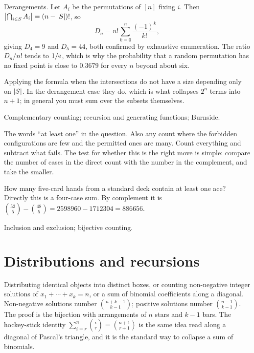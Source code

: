 \begin{worked}
Derangements. Let $A_{i}$ be the permutations of $[n]$ fixing $i$. Then $\left\lvert \bigcap_{i\in S}A_{i}\right\rvert=(n-\left\lvert S\right\rvert)!$, so
\[
D_{n}=n!\sum_{k=0}^{n}\frac{(-1)^{k}}{k!},
\]
giving $D_{4}=9$ and $D_{5}=44$, both confirmed by exhaustive enumeration. The ratio $D_{n}/n!$ tends to $1/\mathrm{e}$, which is why the probability that a random permutation has no fixed point is close to $0.3679$ for every $n$ beyond about six.
\end{worked}

\begin{trap}
Applying the formula when the intersections do not have a size depending only on $\left\lvert S\right\rvert$. In the derangement case they do, which is what collapses $2^{n}$ terms into $n+1$; in general you must sum over the subsets themselves.
\end{trap}

\begin{seealsob}Complementary counting; recursion and generating functions; Burnside.\end{seealsob}

\cue The words ``at least one'' in the question. Also any count where the forbidden configurations are few and the permitted ones are many.
\method Count everything and subtract what fails. The test for whether this is the right move is simple: compare the number of cases in the direct count with the number in the complement, and take the smaller.

\begin{worked}
How many five-card hands from a standard deck contain at least one ace? Directly this is a four-case sum. By complement it is $\binom{52}{5}-\binom{48}{5}=2598960-1712304=886656$.
\end{worked}

\begin{seealsob}Inclusion and exclusion; bijective counting.\end{seealsob}

\section{Distributions and recursions}

\cue Distributing identical objects into distinct boxes, or counting non-negative integer solutions of $x_{1}+\cdots+x_{k}=n$, or a sum of binomial coefficients along a diagonal.
\method Non-negative solutions number $\binom{n+k-1}{k-1}$; positive solutions number $\binom{n-1}{k-1}$. The proof is the bijection with arrangements of $n$ stars and $k-1$ bars. The hockey-stick identity $\sum_{i=r}^{n}\binom{i}{r}=\binom{n+1}{r+1}$ is the same idea read along a diagonal of Pascal's triangle, and it is the standard way to collapse a sum of binomials.


